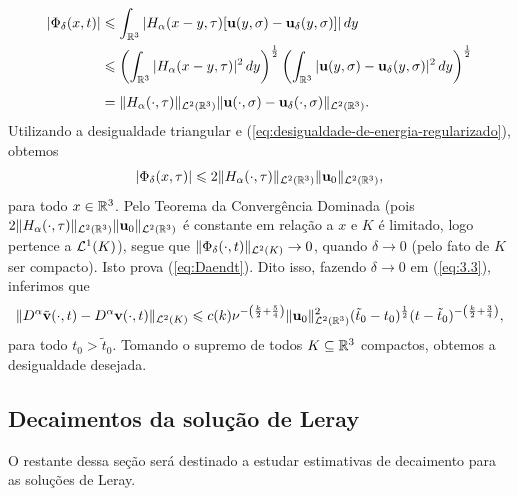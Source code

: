 \begin{prf}
    \[
        \begin{aligned}
            |\Phi_\delta(x,t)| &\leqslant \int_{\mathbb{R}^3} | H_\alpha(x-y,\tau) [\mathbf{u}(y,\sigma) - \mathbf{u}_\delta(y,\sigma)]| \,dy\\
            &\leqslant \left( \int_{\mathbb{R}^3} |H_\alpha(x-y,\tau)|^2 \,dy \right)^{\frac{1}{2}} \left( \int_{\mathbb{R}^3} |\mathbf{u}(y,\sigma) - \mathbf{u}_\delta(y,\sigma)|^2 \,dy \right)^{\frac{1}{2}}\\[4pt] 
            &= \Vert H_\alpha(\cdot,\tau) \Vert_{\mathcal{L}^2(\mathbb{R}^3)} \Vert \mathbf{u}(\cdot,\sigma) - \mathbf{u}_\delta(\cdot,\sigma) \Vert_{\mathcal{L}^2(\mathbb{R}^3)}.
        \end{aligned}
    \]
    Utilizando a desigualdade triangular e (\ref{eq:desigualdade-de-energia-regularizado}), obtemos
    \[
        |\Phi_\delta(x,\tau)| \leqslant 2 \Vert H_\alpha(\cdot,\tau) \Vert_{\mathcal{L}^2(\mathbb{R}^3)} \Vert \mathbf{u}_0 \Vert_{\mathcal{L}^2(\mathbb{R}^3)},
    \]
    para todo $x \in \mathbb{R}^3$. Pelo Teorema da Convergência Dominada (pois $2 \Vert H_\alpha(\cdot,\tau) \Vert_{\mathcal{L}^2(\mathbb{R}^3)} \Vert \mathbf{u}_0 \Vert_{\mathcal{L}^2(\mathbb{R}^3)}$ é constante em relação a $x$ e $K$ é limitado, logo pertence a $\mathcal{L}^1(K)$), segue que $\Vert \Phi_{\delta}(\cdot,t) \Vert_{\mathcal{L}^2(K)} \to 0$, quando $\delta\to 0$ (pelo fato de $K$ ser compacto). Isto prova (\ref{eq:Daendt}).
    Dito isso, fazendo $\delta \to 0$ em (\ref{eq:3.3}), inferimos que
    \[
        \Vert D^\alpha \tilde{\mathbf{v}}(\cdot,t) - D^\alpha \mathbf{v}(\cdot,t) \Vert_{\mathcal{L}^2(K)} \leqslant c(k) \nu^{-\left( \frac{k}{2} + \frac{5}{4} \right)} \Vert \mathbf{u}_0 \Vert^2_{\mathcal{L}^2(\mathbb{R}^3)} (\tilde t_0 - t_0)^{\frac{1}{2}} (t - \tilde t_0)^{-\left( \frac{k}{2} + \frac{3}{4} \right)},
    \]
    para todo $t_0 > \tilde t_0$. Tomando o supremo de todos $K \subseteq \mathbb{R}^3$ compactos, obtemos a desigualdade desejada.
\end{prf}

\subsection{Decaimentos da solução de Leray}

O restante dessa seção será destinado a estudar estimativas de decaimento para as soluções de Leray.

